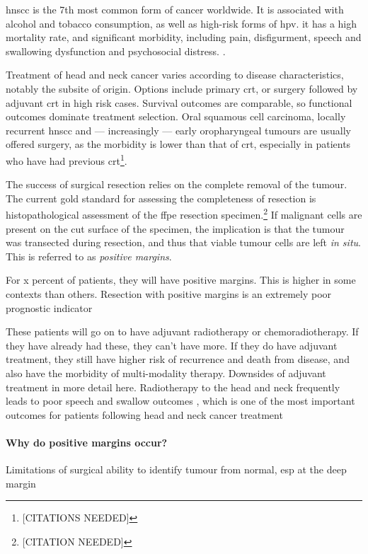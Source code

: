 
\Gls{hnscc} is the 7th most common form of cancer worldwide. 
It is associated with alcohol and tobacco consumption, as well as high-risk forms of \gls{hpv}.
it has a high mortality rate, and significant morbidity, including pain, disfigurment, speech and swallowing dysfunction and psychosocial distress. \cite{chowHeadNeckCancer2020}.

Treatment of head and neck cancer varies according to disease characteristics, notably the subsite of origin.
Options include primary \gls{crt}, or surgery followed by adjuvant \gls{crt} in high risk cases.
Survival outcomes are comparable, so functional outcomes dominate treatment selection.
Oral squamous cell carcinoma, locally recurrent \gls{hnscc} and --- increasingly --- early oropharyngeal tumours are usually offered surgery, as the morbidity is lower than that of \gls{crt}, especially in patients who have had previous \gls{crt}\footnote{[CITATIONS NEEDED]}.

The success of surgical resection relies on the complete removal of the tumour.
The current gold standard for assessing the completeness of resection is histopathological assessment of the \gls{ffpe} resection specimen.\footnote{[CITATION NEEDED]}
If malignant cells are present on the cut surface of the specimen, the implication is that the tumour was transected during resection, and thus that viable tumour cells are left \textit{in situ}.
This is referred to as \emph{positive margins}.


For x percent of patients, they will have positive margins. 
This is higher in some contexts than others.
Resection with positive margins is an extremely poor prognostic indicator

These patients will go on to have adjuvant radiotherapy or chemoradiotherapy.
If they have already had these, they can't have more.
If they do have adjuvant treatment, they still have higher risk of recurrence and death from disease, and also have the morbidity of multi-modality therapy.
Downsides of adjuvant treatment in more detail here.
Radiotherapy to the head and neck frequently leads to poor speech and swallow outcomes \cite{machtayFactorsAssociatedSevere2008, wangPharyngoesophagealStrictureTreatment2012}, which is one of the most important outcomes for patients following head and neck cancer treatment \cite{wilsonDysphagiaNonsurgicalHead2011} 

\paragraph{Why do positive margins occur?}
Limitations of surgical ability to identify tumour from normal, esp at the deep margin

